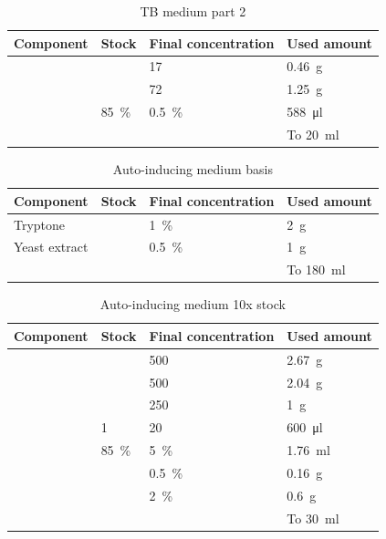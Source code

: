 \documentclass[a4paper]{scrreprt}
\begin{document}
\begin{table}
	\centering
	\begin{tabu}{llll}
		\toprule
		Component & Stock & Final concentration & Used amount \\
		\midrule
		 & & \SI{17}{\milli\Molar} & \SI{0.46}{\g} \\
		 & & \SI{72}{\milli\Molar} & \SI{1.25}{\g} \\
		 & \SI{85}{\percent} & \SI{0.5}{\percent} & \SI{588}{\ul} \\
		 & & & To \SI{20}{\ml} \\
		\bottomrule
	\end{tabu}
	\caption{TB medium part 2}
	\label{tbl:medium_tb_2}
\end{table}

\begin{table}
	\centering
	\begin{tabu}{llll}
		\toprule
		Component & Stock & Final concentration & Used amount \\
		\midrule
		Tryptone & & \SI{1}{\percent} & \SI{2}{\g} \\
		Yeast extract & & \SI{0.5}{\percent} & \SI{1}{\g} \\
		 & & & To \SI{180}{\ml} \\
		\bottomrule
	\end{tabu}
	\caption{Auto-inducing medium basis}
	\label{tbl:medium_auto_basis}
\end{table}

\begin{table}
	\centering
	\begin{tabu}{llll}
		\toprule
		Component & Stock & Final concentration & Used amount \\
		\midrule
		 & & \SI{500}{\milli\Molar} & \SI{2.67}{\g} \\
		 & & \SI{500}{\milli\Molar} & \SI{2.04}{\g} \\
		 & & \SI{250}{\milli\Molar} & \SI{1}{\g} \\
		 & \SI{1}{\Molar} & \SI{20}{\milli\Molar} & \SI{600}{\ul} \\
		 & \SI{85}{\percent} & \SI{5}{\percent} & \SI{1.76}{\ml} \\
		 & & \SI{0.5}{\percent} & \SI{0.16}{\g} \\
		 & & \SI{2}{\percent} & \SI{0.6}{\g} \\
		 & & & To \SI{30}{\ml} \\
		\bottomrule
	\end{tabu}
	\caption{Auto-inducing medium 10x stock}
	\label{tbl:medium_auto_stock}
\end{table}
\end{document}
